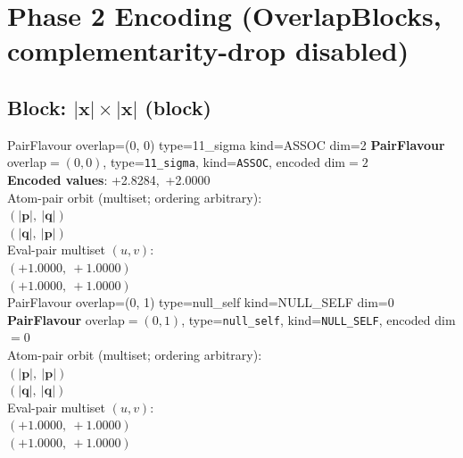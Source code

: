 \documentclass[a4paper,11pt]{article}
\newcommand{\vc}[1]{\ensuremath{\mathbf{#1}}}
\newcommand{\dnfagmiihhiejm}[1]{|\vc{#1}|}
\begin{document}
\section{Phase 2 Encoding  (OverlapBlocks, complementarity-drop disabled)}

\subsection{Block: $\dnfagmiihhiejm{x} \times \dnfagmiihhiejm{x}$  (block)}
    PairFlavour  overlap=(0, 0)  type=11\_sigma  kind=ASSOC  dim=2
\textbf{PairFlavour} overlap$=(0, 0)$, type=\texttt{11\_sigma}, kind=\texttt{ASSOC}, encoded dim$=2$\\
\textbf{      Encoded values}: +2.8284,\ +2.0000\\
\quad Atom-pair orbit (multiset; ordering arbitrary):\\
$(\dnfagmiihhiejm{p},\ \dnfagmiihhiejm{q})$\\
$(\dnfagmiihhiejm{q},\ \dnfagmiihhiejm{p})$\\
\quad Eval-pair multiset $(u, v)$:\\
$(+1.0000,\ +1.0000)$\\
$(+1.0000,\ +1.0000)$\\
    PairFlavour  overlap=(0, 1)  type=null\_self  kind=NULL\_SELF  dim=0
\textbf{PairFlavour} overlap$=(0, 1)$, type=\texttt{null\_self}, kind=\texttt{NULL\_SELF}, encoded dim$=0$\\
\quad Atom-pair orbit (multiset; ordering arbitrary):\\
$(\dnfagmiihhiejm{p},\ \dnfagmiihhiejm{p})$\\
$(\dnfagmiihhiejm{q},\ \dnfagmiihhiejm{q})$\\
\quad Eval-pair multiset $(u, v)$:\\
$(+1.0000,\ +1.0000)$\\
$(+1.0000,\ +1.0000)$\\
\end{document}
